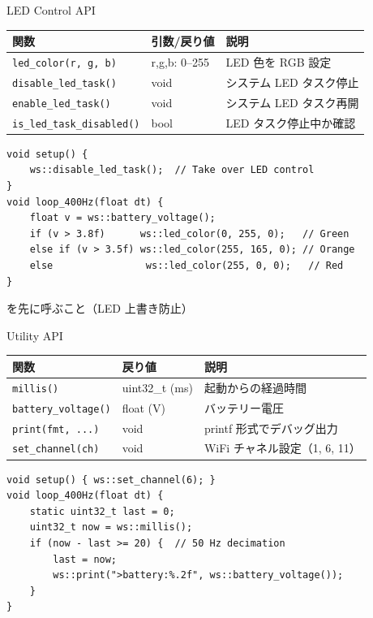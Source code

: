 \begin{frame}[fragile]{LED Control API}
  {\small
  \begin{tabular}{lll}
    \hline
    \textbf{関数} & \textbf{引数/戻り値} & \textbf{説明} \\
    \hline
    \texttt{led\_color(r, g, b)}      & r,g,b: 0--255 & LED 色を RGB 設定 \\
    \texttt{disable\_led\_task()}     & void           & システム LED タスク停止 \\
    \texttt{enable\_led\_task()}      & void           & システム LED タスク再開 \\
    \texttt{is\_led\_task\_disabled()} & bool          & LED タスク停止中か確認 \\
    \hline
  \end{tabular}
  }

  \vspace{0.3em}

  \begin{lstlisting}[style=sfcpp, basicstyle=\ttfamily\scriptsize]
void setup() {
    ws::disable_led_task();  // Take over LED control
}
void loop_400Hz(float dt) {
    float v = ws::battery_voltage();
    if (v > 3.8f)      ws::led_color(0, 255, 0);   // Green
    else if (v > 3.5f) ws::led_color(255, 165, 0); // Orange
    else                ws::led_color(255, 0, 0);   // Red
}
  \end{lstlisting}

  \vspace{0.2em}
  {\footnotesize {}  を先に呼ぶこと（LED 上書き防止）}
\end{frame}

\begin{frame}[fragile]{Utility API}
  {\small
  \begin{tabular}{lll}
    \hline
    \textbf{関数} & \textbf{戻り値} & \textbf{説明} \\
    \hline
    \texttt{millis()}           & uint32\_t (ms) & 起動からの経過時間 \\
    \texttt{battery\_voltage()} & float (V)      & バッテリー電圧 \\
    \texttt{print(fmt, ...)}    & void           & printf 形式でデバッグ出力 \\
    \texttt{set\_channel(ch)}   & void           & WiFi チャネル設定（1, 6, 11） \\
    \hline
  \end{tabular}
  }

  \vspace{0.3em}

  \begin{lstlisting}[style=sfcpp, basicstyle=\ttfamily\scriptsize]
void setup() { ws::set_channel(6); }
void loop_400Hz(float dt) {
    static uint32_t last = 0;
    uint32_t now = ws::millis();
    if (now - last >= 20) {  // 50 Hz decimation
        last = now;
        ws::print(">battery:%.2f", ws::battery_voltage());
    }
}
  \end{lstlisting}
\end{frame}

